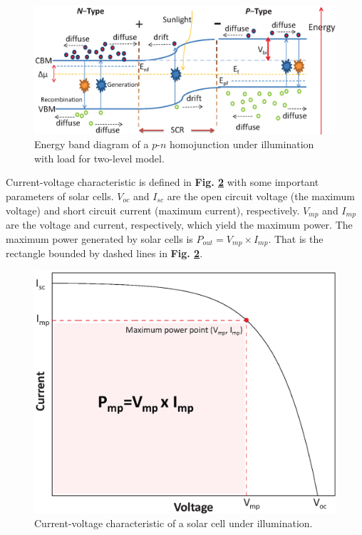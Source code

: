 \documentclass[a4paper, 12pt, titlepage,oneside,drop]{kthesis}
\begin{document}
\begin{figure}[H]
\centering
\includegraphics[scale=0.5]{illumination1.eps}
\caption{Energy band diagram of a $p$-$n$ homojunction under illumination with load for two-level model.}
\label{illu1}
\end{figure}


Current-voltage characteristic is defined in \textbf{Fig. \ref{ivcharac}} with some important parameters of solar cells. $V_{oc}$ and $I_{sc}$ are the open circuit voltage (the maximum voltage) and short circuit current
(maximum current), respectively. $V_{mp}$ and $I_{mp}$ are the voltage and current, respectively,  which yield the maximum power. The maximum power generated by solar cells
is $P_{out}=V_{mp} \times I_{mp}$. That is the rectangle bounded by dashed lines in \textbf{Fig. \ref{ivcharac}}. 

\begin{figure}[H]
\centering
\includegraphics[scale=0.5]{IV.eps}
\caption{Current-voltage characteristic of a solar cell under illumination.}
\label{ivcharac}
\end{figure}
\end{document}
